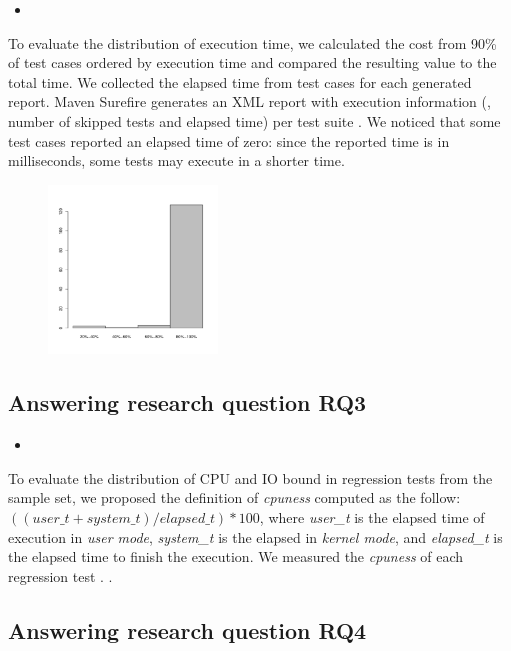 \begin{itemize}
    \item \RQC
\end{itemize}

To evaluate the distribution of execution time, we calculated the cost
from 90\% of test cases ordered by execution time and compared the
resulting value to the total time.  We collected the elapsed time from
test cases for each generated report. Maven Surefire generates an XML
report with execution information (\eg, number of skipped tests and
elapsed time) per test suite . We noticed that some test cases
reported an elapsed time of zero: since the reported time is in
milliseconds, some tests may execute in a shorter time. 

\begin{figure}[h!]
    \centering
    \includegraphics[width=0.4\textwidth]{figs/tcdistrib.pdf}
    \caption{}
\end{figure}

\subsection{Answering research question RQ3}
\label{sec:rqThree}

\begin{itemize}
    \item \RQB
\end{itemize}

To evaluate the distribution of CPU and IO bound in regression tests
from the sample set, we proposed the definition of \emph{cpuness}
computed as the follow: $((user\_t + system\_t) / elapsed\_t) * 100$,
where \emph{user\_t} is the elapsed time of execution in \emph{user
mode}, \emph{system\_t} is the elapsed in \emph{kernel mode}, and
\emph{elapsed\_t} is the elapsed time to finish the execution. We
measured the \emph{cpuness} of each regression test  .  .  

\subsection{Answering research question RQ4}
\label{sec:rqfour}




